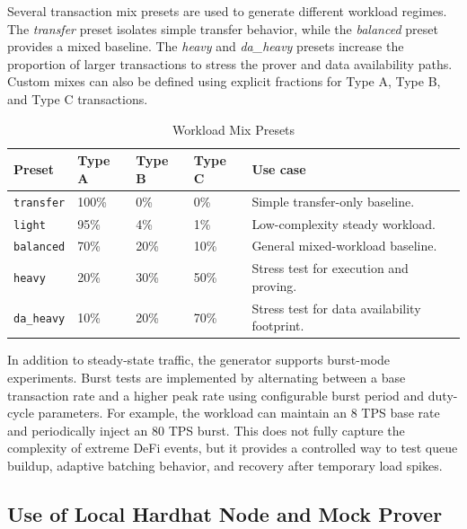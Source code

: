 Several transaction mix presets are used to generate different workload regimes. The \textit{transfer} preset isolates simple transfer behavior, while the \textit{balanced} preset provides a mixed baseline. The \textit{heavy} and \textit{da\_heavy} presets increase the proportion of larger transactions to stress the prover and data availability paths. Custom mixes can also be defined using explicit fractions for Type A, Type B, and Type C transactions.

\begin{table}[!htbp]
\centering
\caption{Workload Mix Presets}
\label{tab:workload_mix_presets}
\scriptsize
\setlength{\tabcolsep}{3pt}
\renewcommand{\arraystretch}{1.18}
\begin{tabularx}{\textwidth}{@{}p{}p{}p{}p{}Y@{}}
\toprule
\textbf{Preset} & \textbf{Type A} & \textbf{Type B} & \textbf{Type C} & \textbf{Use case} \\
\midrule
\texttt{transfer} & 100\% & 0\% & 0\% & Simple transfer-only baseline. \\
\addlinespace
\texttt{light} & 95\% & 4\% & 1\% & Low-complexity steady workload. \\
\addlinespace
\texttt{balanced} & 70\% & 20\% & 10\% & General mixed-workload baseline. \\
\addlinespace
\texttt{heavy} & 20\% & 30\% & 50\% & Stress test for execution and proving. \\
\addlinespace
\texttt{da\_heavy} & 10\% & 20\% & 70\% & Stress test for data availability footprint. \\
\bottomrule
\end{tabularx}
\normalsize
\end{table}

In addition to steady-state traffic, the generator supports burst-mode experiments. Burst tests are implemented by alternating between a base transaction rate and a higher peak rate using configurable burst period and duty-cycle parameters. For example, the workload can maintain an 8 TPS base rate and periodically inject an 80 TPS burst. This does not fully capture the complexity of extreme DeFi events, but it provides a controlled way to test queue buildup, adaptive batching behavior, and recovery after temporary load spikes.

\subsection{Use of Local Hardhat Node and Mock Prover}
\label{subsec:hardhat_mock_prover}

